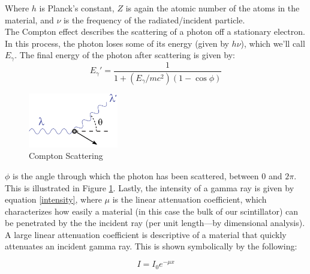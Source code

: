 \documentclass{amsart}
\begin{document}
Where $h$ is Planck's constant, $Z$ is again the atomic number of the atoms in the material, and $\nu$ is the frequency of the radiated/incident particle.\\
The Compton effect describes the scattering of a photon off a stationary electron. In this process, the photon loses some of its energy (given by $h\nu$), which we'll call $E_{\gamma}$. The final energy of the photon after scattering is given by:
\begin{equation}
    \label{compton}
    E_{\gamma}\prime = \dfrac{1}{1+(E_{\gamma}/mc^2)(1-\cos\phi)}
\end{equation}
\begin{figure}
    \includegraphics[width=0.35\textwidth]{compton.png}
    \caption{Compton Scattering}
    \label{fig:angle}
\end{figure}

$\phi$ is the angle through which the photon has been scattered, between $0$ and $2\pi$. This is illustrated in Figure \ref{fig:angle}. Lastly, the intensity of a gamma ray is given by equation \ref{intensity}, where $\mu$ is the linear attenuation coefficient, which characterizes how easily a material (in this case the bulk of our scintillator) can be penetrated by the the incident ray (per unit length---by dimensional analysis). A large linear attenuation coefficient is descriptive of a material that quickly attenuates an incident gamma ray. This is shown symbolically by the following:

\begin{equation}
    I = I_0e^{-\mu x}
    \label{intensity}
\end{equation}
\end{document}
